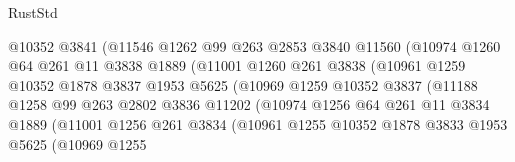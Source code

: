 \begin{lexlean}{RustStd}
\begin{coremodule}
                              @10352
                              @3841
                              (@11546
                                @1262
                                @99
                                @263
                                @2853
                                @3840
                                @11560
                                (@10974
                                  @1260
                                  @64
                                  @261
                                  @11
                                  @3838
                                  @1889
                                  (@11001
                                    @1260
                                    @261
                                    @3838
                                    (@10961
                                      @1259
                                      @10352
                                      @1878
                                      @3837
                                      @1953
                                      @5625
                                      (@10969
                                        @1259
                                        @10352
                                        @3837
                                        (@11188
                                          @1258
                                          @99
                                          @263
                                          @2802
                                          @3836
                                          @11202
                                          (@10974
                                            @1256
                                            @64
                                            @261
                                            @11
                                            @3834
                                            @1889
                                            (@11001
                                              @1256
                                              @261
                                              @3834
                                              (@10961
                                                @1255
                                                @10352
                                                @1878
                                                @3833
                                                @1953
                                                @5625
                                                (@10969
                                                  @1255

\end{coremodule}
\end{lexlean}
